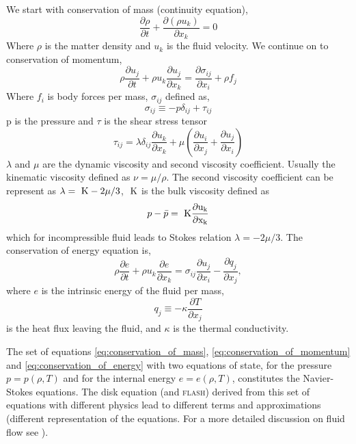 \documentclass[modern]{aastex62}
\newcommand{\flash}[1]{\textsc{flash}#1}
\def \K{~\rm{K}}
\begin{document}
We start with conservation of mass (continuity equation),
\begin{equation}\label{eq:conservation_of_mass}
\frac{\partial \rho}{\partial t} + \frac{\partial (\rho u_k)}{\partial x_k} = 0
\end{equation}
Where $\rho$ is the matter density and $u_k$ is the fluid velocity.
We continue on to conservation of momentum,
\begin{equation}\label{eq:conservation_of_momentum}
\rho\frac{\partial u_j}{\partial t} + \rho u_k \frac{\partial u_j}{\partial x_k}=\frac{\partial \sigma_{ij}}{\partial x_i}+\rho f_j
\end{equation}
Where $f_i$ is body forces per mass, $\sigma_{ij}$ defined as, 
\begin{equation}
\sigma_{ij} \equiv -p\delta_{ij}+\tau_{ij}
\end{equation}
p is the pressure and $\tau$ is the shear stress tensor
\begin{equation}
     \tau_{ij} = \lambda \delta_{ij} \frac{\partial u_k}{\partial x_k}+ \mu \left( \frac{\partial u_i}{\partial x_j} + \frac{\partial u_j}{\partial x_i} \right)
\end{equation}
$\lambda$ and $\mu$ are the dynamic viscosity and second viscosity coefficient. Usually the kinematic viscosity defined as $\nu = \mu/\rho$. The second viscosity coefficient can be represent as $\lambda = \K - 2\mu/3$, $\K$ is the bulk viscosity defined as
\begin{equation}
    p-\bar p = \K \frac{\partial u_k}{\partial x_k} 
\end{equation}
which for incompressible fluid leads to Stokes relation $\lambda = - 2\mu/3$.
The conservation of energy equation is,
\begin{equation} \label{eq:conservation_of_energy}
\rho\frac{\partial e}{\partial t}+\rho u_k \frac{\partial e}{\partial x_k} = \sigma_{ij} \frac{\partial u_j}{\partial x_i} - \frac{\partial q_j}{\partial x_j}, 
\end{equation}
where $e$ is the intrinsic energy of the fluid per mass, 
\begin{equation}
q_j \equiv -\kappa \frac {\partial T}{\partial x_j}    
\end{equation}
is the heat flux leaving the fluid, and $\kappa$ is the thermal conductivity.

The set of equations \ref{eq:conservation_of_mass}, \ref{eq:conservation_of_momentum} and \ref{eq:conservation_of_energy} with two equations of state, for the pressure $p=p(\rho,T)$ and for the internal energy $e=e(\rho,T)$, constitutes the Navier-Stokes equations. 
The disk equation (and \flash{}) derived from this set of equations with different physics lead to different terms and approximations (different representation of the equations. 
For a more detailed discussion on fluid flow see \citealt{currie2002fundamental}).
\end{document}
